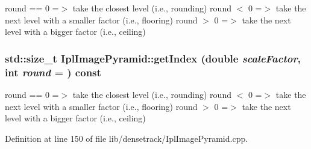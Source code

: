 \label{class_ipl_image_pyramid_a079949237facf732d588900b143ed3d6}
round == 0 =$>$ take the closest level (i.e., rounding) round $<$ 0 =$>$ take the next level with a smaller factor (i.e., flooring) round $>$ 0 =$>$ take the next level with a bigger factor (i.e., ceiling) \hypertarget{class_ipl_image_pyramid_a079949237facf732d588900b143ed3d6}{
\subsubsection[{getIndex}]{\setlength{\rightskip}{0pt plus 5cm}std::size\_\-t IplImagePyramid::getIndex (double {\em scaleFactor}, \/  int {\em round} = {}) const}}
\label{class_ipl_image_pyramid_a079949237facf732d588900b143ed3d6}
round == 0 =$>$ take the closest level (i.e., rounding) round $<$ 0 =$>$ take the next level with a smaller factor (i.e., flooring) round $>$ 0 =$>$ take the next level with a bigger factor (i.e., ceiling) 

Definition at line 150 of file lib/densetrack/IplImagePyramid.cpp.

